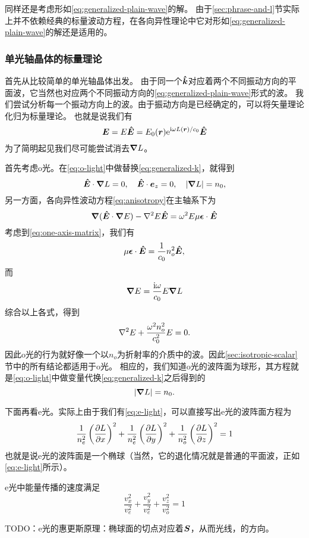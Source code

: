 \documentclass[UTF8, a4paper]{ctexart}
\newcommand*{\ii}{\mathrm{i}}
\newcommand*{\ee}{\mathrm{e}}
\begin{document}
同样还是考虑形如\eqref{eq:generalized-plain-wave}的解。
由于\ref{sec:phrase-and-l}节实际上并不依赖经典的标量波动方程，在各向异性理论中它对形如\eqref{eq:generalized-plain-wave}的解还是适用的。

\subsubsection{单光轴晶体的标量理论}

首先从比较简单的单光轴晶体出发。
由于同一个$\vu*{k}$对应着两个不同振动方向的平面波，它当然也对应两个不同振动方向的\eqref{eq:generalized-plain-wave}形式的波。
我们尝试分析每一个振动方向上的波。由于振动方向是已经确定的，可以将矢量理论化归为标量理论。
也就是说我们有
\[
    \vb*{E} = E \vu*{E} = E_0(\vb*{r}) \ee^{\ii \omega L(\vb*{r}) / c_0} \vu*{E}
\]
为了简明起见我们尽可能尝试消去$\grad{L}$。

首先考虑o光。在\eqref{eq:o-light}中做替换\eqref{eq:generalized-k}，就得到
\[
    \vu*{E} \cdot \grad{L} = 0, \quad \vu*{E} \cdot \vb*{e}_z = 0, \quad \abs{\grad{L}} = n_0,
\]
另一方面，各向异性波动方程\eqref{eq:anisotropy}在主轴系下为
\[
    \grad{(\vu*{E} \cdot \grad{E})} - \laplacian E \vu*{E} = \omega^2 E \mu \vb*{\epsilon} \cdot \vu*{E}
\]
考虑到\eqref{eq:one-axis-matrix}，我们有
\[
    \mu \vb*{\epsilon} \cdot \vu*{E} = \frac{1}{c_0} n_o^2 \vu*{E},
\]
而
\[
    \grad{E} = \frac{\ii \omega}{c_0} E \grad{L}
\]
综合以上各式，得到
\begin{equation}
    \laplacian E + \frac{\omega^2 n_o^2}{c_0^2} E = 0.
    \label{eq:o-light-wave-eq}
\end{equation}
因此o光的行为就好像一个以$n_o$为折射率的介质中的波。因此\ref{sec:isotropic-scalar}节中的所有结论都适用于o光。
相应的，我们知道o光的波阵面为球形，其方程就是\eqref{eq:o-light}中做变量代换\eqref{eq:generalized-k}之后得到的
\begin{equation}
    \abs{\grad{L}} = n_0.
\end{equation}

下面再看e光。实际上由于我们有\eqref{eq:e-light}，可以直接写出e光的波阵面方程为
\begin{equation}
    \frac{1}{n_e^2} \left( \pdv{L}{x} \right)^2 + \frac{1}{n_e^2} \left( \pdv{L}{y} \right)^2 + \frac{1}{n_o^2} \left( \pdv{L}{z} \right)^2 = 1
\end{equation}
也就是说e光的波阵面是一个椭球（当然，它的退化情况就是普通的平面波，正如\eqref{eq:e-light}所示）。

e光中能量传播的速度满足
\begin{equation}
    \frac{v_x^2}{v_e^2} + \frac{v_y^2}{v_e^2} + \frac{v_z^2}{v_o^2} = 1
\end{equation}

TODO：e光的惠更斯原理：椭球面的切点对应着$\vb*{S}$，从而光线，的方向。
\end{document}
